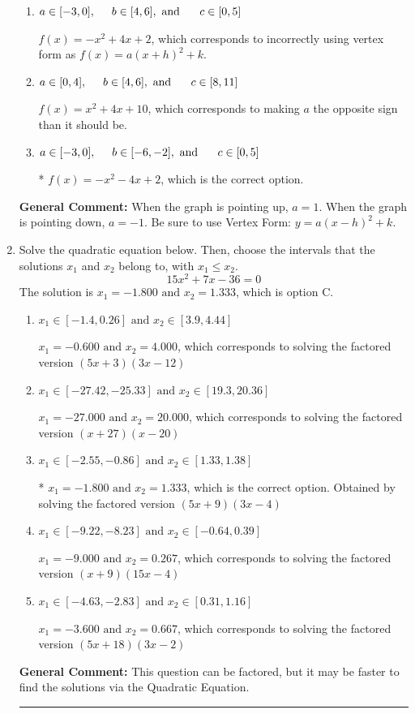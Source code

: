 \documentclass{extbook}[14pt]
\newcommand{\litem}[1]{\item #1

\rule{\textwidth}{0.4pt}}
\begin{document}
\begin{enumerate}
{\begin{enumerate}[label=\Alph*.]
$f(x)=-x^{2} +4 x -10$, which corresponds to incorrectly using vertex form as $f(x) = a(x+h)^2 - k$.
\item \( a \in [-3, 0], \hspace*{5mm} b \in [4, 6], \text{ and } \hspace*{5mm} c \in [0, 5] \)

$f(x)=-x^{2} +4 x + 2$, which corresponds to incorrectly using vertex form as $f(x) = a(x+h)^2+k$.
\item \( a \in [0, 4], \hspace*{5mm} b \in [4, 6], \text{ and } \hspace*{5mm} c \in [8, 11] \)

$f(x)=x^{2} +4 x + 10$, which corresponds to making $a$ the opposite sign than it should be.
\item \( a \in [-3, 0], \hspace*{5mm} b \in [-6, -2], \text{ and } \hspace*{5mm} c \in [0, 5] \)

* $f(x)=-x^{2} -4 x + 2$, which is the correct option.
\end{enumerate}

\textbf{General Comment:} When the graph is pointing up, $a=1$. When the graph is pointing down, $a=-1$. Be sure to use Vertex Form: $y = a(x-h)^2+k$.
}
\litem{
Solve the quadratic equation below. Then, choose the intervals that the solutions $x_1$ and $x_2$ belong to, with $x_1 \leq x_2$.
\[ 15x^{2} +7 x -36 = 0 \]The solution is \( x_1 = -1.800 \text{ and } x_2 = 1.333 \), which is option C.\begin{enumerate}[label=\Alph*.]
\item \( x_1 \in [-1.4, 0.26] \text{ and } x_2 \in [3.9, 4.44] \)

$x_1 = -0.600 \text{ and } x_2 = 4.000$, which corresponds to solving the factored version $(5x + 3)(3x -12)$
\item \( x_1 \in [-27.42, -25.33] \text{ and } x_2 \in [19.3, 20.36] \)

$x_1 = -27.000 \text{ and } x_2 = 20.000$, which corresponds to solving the factored version $(x + 27)(x -20)$
\item \( x_1 \in [-2.55, -0.86] \text{ and } x_2 \in [1.33, 1.38] \)

* $x_1 = -1.800 \text{ and } x_2 = 1.333$, which is the correct option. Obtained by solving the factored version $(5x + 9)(3x -4)$
\item \( x_1 \in [-9.22, -8.23] \text{ and } x_2 \in [-0.64, 0.39] \)

$x_1 = -9.000 \text{ and } x_2 = 0.267$, which corresponds to solving the factored version $(x + 9)(15x -4)$
\item \( x_1 \in [-4.63, -2.83] \text{ and } x_2 \in [0.31, 1.16] \)

$x_1 = -3.600 \text{ and } x_2 = 0.667$, which corresponds to solving the factored version $(5x + 18)(3x -2)$
\end{enumerate}

\textbf{General Comment:} This question can be factored, but it may be faster to find the solutions via the Quadratic Equation.
}
\end{enumerate}
\end{document}
